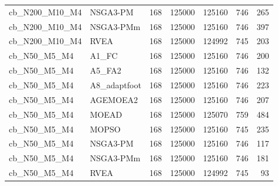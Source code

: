 \begin{tabular}{llrrrrr}
cb_N200_M10_M4 & NSGA3-PM & 168 & 125000 & 125160 & 746 & 265 \\
cb_N200_M10_M4 & NSGA3-PMm & 168 & 125000 & 125160 & 746 & 397 \\
cb_N200_M10_M4 & RVEA & 168 & 125000 & 124992 & 745 & 203 \\
cb_N50_M5_M4 & A1_FC & 168 & 125000 & 125160 & 746 & 200 \\
cb_N50_M5_M4 & A5_FA2 & 168 & 125000 & 125160 & 746 & 132 \\
cb_N50_M5_M4 & A8_adaptfoot & 168 & 125000 & 125160 & 746 & 223 \\
cb_N50_M5_M4 & AGEMOEA2 & 168 & 125000 & 125160 & 746 & 207 \\
cb_N50_M5_M4 & MOEAD & 168 & 125000 & 125070 & 759 & 484 \\
cb_N50_M5_M4 & MOPSO & 168 & 125000 & 125160 & 745 & 235 \\
cb_N50_M5_M4 & NSGA3-PM & 168 & 125000 & 125160 & 746 & 117 \\
cb_N50_M5_M4 & NSGA3-PMm & 168 & 125000 & 125160 & 746 & 181 \\
cb_N50_M5_M4 & RVEA & 168 & 125000 & 124992 & 745 & 93 \\
\bottomrule
\end{tabular}
